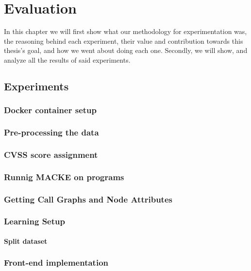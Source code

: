 
\chapter{Evaluation}\label{chapter:Evaluation}

In this chapter we will first show what our methodology for experimentation was, the reasoning behind each experiment, their value and contribution towards this thesis's goal, and how we went about doing each one. Secondly, we will show, and analyze all the results of said experiments.

\section{Experiments}

\subsection{Docker container setup}

\subsection{Pre-processing the data}

\subsection{CVSS score assignment}

\subsection{Runnig MACKE on programs}

\subsection{Getting Call Graphs and Node Attributes}

\subsection{Learning Setup}

\subsubsection{Split dataset}

\subsection{Front-end implementation}

